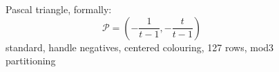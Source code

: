 
\begin{figure}[p]

    \noindent{}

    \captionsetup{singlelinecheck=off}
    \caption[.]{
        Pascal triangle, formally: 
        \begin{displaymath}
            \mathcal{P}=\left(-\frac{1}{t - 1}, -\frac{t}{t - 1}\right)
        \end{displaymath} %
        standard, handle negatives, centered colouring, 127 rows, mod3 partitioning}

    \label{fig:pascal-standard-handle-negatives-centered-colouring-127-rows-mod3-partitioning-triangle}

\end{figure}
